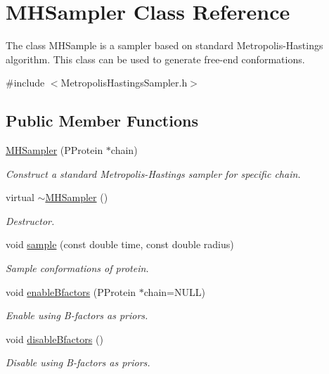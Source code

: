 \hypertarget{classMHSampler}{\section{M\-H\-Sampler Class Reference}
\label{classMHSampler}
}


The class M\-H\-Sample is a sampler based on standard Metropolis-\/\-Hastings algorithm. This class can be used to generate free-\/end conformations.  




{\ttfamily \#include $<$Metropolis\-Hastings\-Sampler.\-h$>$}

\subsection*{Public Member Functions}
\begin{DoxyCompactItemize}
\item 
\hypertarget{classMHSampler_a679bcaeb40eb2c93d6c887aa0caf5ffb}{\hyperlink{classMHSampler_a679bcaeb40eb2c93d6c887aa0caf5ffb}{M\-H\-Sampler} (P\-Protein $\ast$chain)}\label{classMHSampler_a679bcaeb40eb2c93d6c887aa0caf5ffb}

\begin{DoxyCompactList}\small\item\em Construct a standard Metropolis-\/\-Hastings sampler for specific chain. \end{DoxyCompactList}\item 
\hypertarget{classMHSampler_a616f50fbfd701e216ec0fe001e43fae2}{virtual \hyperlink{classMHSampler_a616f50fbfd701e216ec0fe001e43fae2}{$\sim$\-M\-H\-Sampler} ()}\label{classMHSampler_a616f50fbfd701e216ec0fe001e43fae2}

\begin{DoxyCompactList}\small\item\em Destructor. \end{DoxyCompactList}\item 
void \hyperlink{classMHSampler_acc6e5c4d51b6515abcc08826e086a19b}{sample} (const double time, const double radius)
\begin{DoxyCompactList}\small\item\em Sample conformations of protein. \end{DoxyCompactList}\item 
void \hyperlink{classMHSampler_ae959c85bfd635c79bc1530128c974e92}{enable\-Bfactors} (P\-Protein $\ast$chain=N\-U\-L\-L)
\begin{DoxyCompactList}\small\item\em Enable using B-\/factors as priors. \end{DoxyCompactList}\item 
\hypertarget{classMHSampler_a04e42f35ed5a96b32640cb3cb6f14220}{void \hyperlink{classMHSampler_a04e42f35ed5a96b32640cb3cb6f14220}{disable\-Bfactors} ()}\label{classMHSampler_a04e42f35ed5a96b32640cb3cb6f14220}

\begin{DoxyCompactList}\small\item\em Disable using B-\/factors as priors. \end{DoxyCompactList}\end{DoxyCompactItemize}
